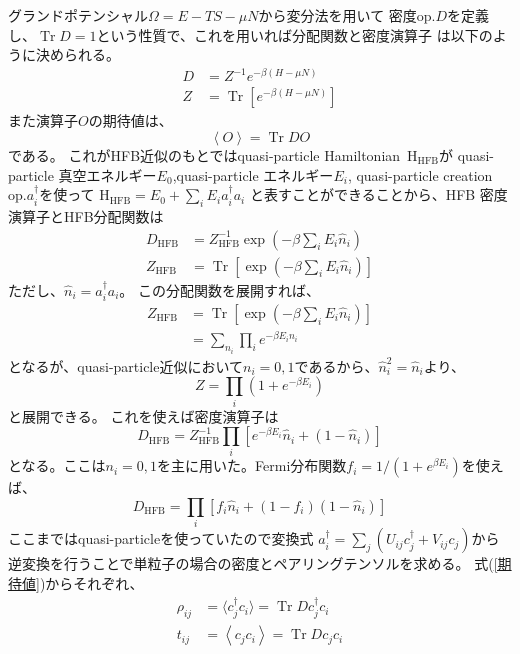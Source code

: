\documentclass[a4paper]{jsreport}
\begin{document}
  グランドポテンシャル$\Omega=E- TS -\mu N$から変分法を用いて
  密度op.$D$を定義し、$\operatorname{Tr}D=1$という性質で、これを用いれば分配関数と密度演算子
  は以下のように決められる。
  \begin{align}
    D &= Z^{-1}e^{-\beta(H-\mu N)}\\
    Z &= \operatorname{Tr}\left[e^{-\beta(H-\mu N)}\right]
  \end{align}
  また演算子$O$の期待値は、
  \begin{equation}
    \left\langle O\right\rangle=\operatorname{Tr}DO\label{期待値}
  \end{equation}
  である。
  これがHFB近似のもとではquasi-particle Hamiltonian\ $\operatorname{H_{\text{HFB}}}$が
  quasi-particle 真空エネルギー$E_0$,quasi-particle エネルギー$E_i$,
  quasi-particle creation op.$a_i^{\dagger}$を使って
  $\operatorname{H_{\text{HFB}}}=E_0 + \sum_{i}E_i a_i^{\dagger}a_i$
  と表すことができることから、HFB 密度演算子とHFB分配関数は
  \begin{align}
    D_{\text{HFB}} &= Z_{\text{HFB}}^{-1}\exp\left(-\beta \sum_i E_i \hat{n}_i\right)\\
    Z_{\text{HFB}} &= \operatorname{Tr}\left[\exp\left(-\beta \sum_i E_i \hat{n}_i\right)\right]
  \end{align}
  ただし、$\hat{n}_i = a_i^{\dagger}a_i$。
  この分配関数を展開すれば、
  \begin{align}
    Z_{\text{HFB}} &= \operatorname{Tr}\left[\exp\left(-\beta \sum_i E_i \hat{n}_i\right)\right]\\
    &= \sum_{n_i}\prod _{i} e^{-\beta E_i n_i}
  \end{align}
  となるが、quasi-particle近似において$n_i=0,1$であるから、$\hat{n}_i^2=\hat{n}_i$より、
  \begin{equation}
    Z=\prod _{i} \left(1 + e^{-\beta E_i}\right)
  \end{equation}
  と展開できる。
  これを使えば密度演算子は
  \begin{equation}
    D_{\text{HFB}} = Z_{\text{HFB}}^{-1}\prod _{i}
    \left[e^{-\beta E_i}\hat{n}_i + (1 - \hat{n}_i)\right]
  \end{equation}
  となる。ここは$n_i=0,1$を主に用いた。Fermi分布関数$f_i=1/(1 + e^{\beta E_i})$を使えば、
  \begin{equation}
    D_{\text{HFB}}=\prod_i \left[f_i\hat{n}_i+(1 - f_i)(1 - \hat{n}_i)\right]
  \end{equation}
  ここまではquasi-particleを使っていたので変換式
  $a_i^{\dagger} = \sum_{j}(U_{ij}c_j^{\dagger}+V_{ij}c_j)$から
  逆変換を行うことで単粒子の場合の密度とペアリングテンソルを求める。
  式(\ref{期待値})からそれぞれ、
  \begin{align}
    \rho_{ij} &= \langle c_j^\dagger c_i\rangle=\operatorname{Tr}D c_j^\dagger c_i\\
    t_{ij}    &= \left\langle c_j c_i\right\rangle=\operatorname{Tr}D c_j c_i
  \end{align}
\end{document}
